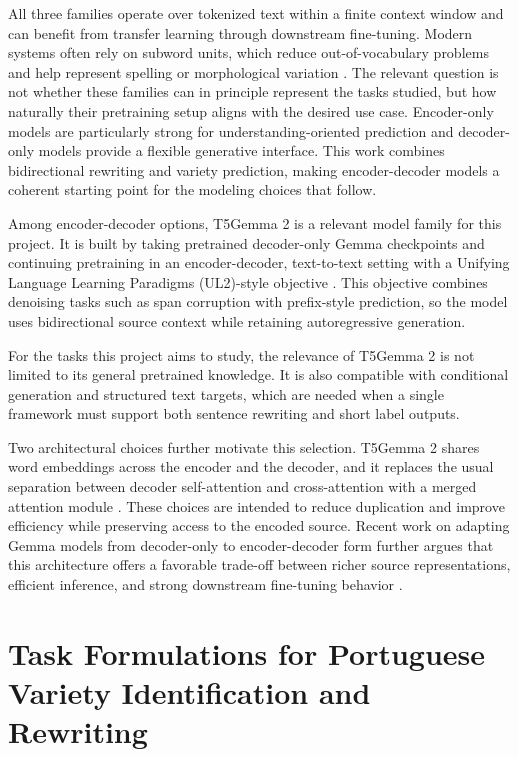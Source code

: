 All three families operate over tokenized text within a finite context window
and can benefit from transfer learning through downstream fine-tuning. Modern
systems often rely on subword units, which reduce out-of-vocabulary problems
and help represent spelling or morphological variation
\mbox{\citep{sennrich-etal-2016-neural}}.
The relevant question is not whether these families can in principle represent
the tasks studied, but how naturally their pretraining setup aligns
with the desired use case. Encoder-only models are particularly strong for
understanding-oriented prediction and decoder-only models provide a flexible
generative interface. This work combines bidirectional rewriting and variety prediction, making
encoder-decoder models a coherent starting point for the modeling choices that
follow.

Among encoder-decoder options, T5Gemma 2 is a relevant model family for this
project. It is built by taking pretrained decoder-only Gemma checkpoints and
continuing pretraining in an encoder-decoder, text-to-text
setting with a Unifying Language Learning Paradigms (UL2)-style objective
\citep{zhang2025t5gemma2seeingreading,Tay2023}. This objective combines denoising
tasks such as span corruption with prefix-style prediction, so the model uses
bidirectional source context while retaining autoregressive generation.

For the tasks this project aims to study, the relevance of T5Gemma 2 is not
limited to its general pretrained knowledge. It is also compatible with
conditional generation and structured text targets, which are needed when a
single framework must support both sentence rewriting and short label outputs.

Two architectural choices further motivate this selection. T5Gemma 2 shares
word embeddings across the encoder and the decoder, and it replaces the usual
separation between decoder self-attention and cross-attention with a merged
attention module \citep{zhang2025t5gemma2seeingreading}. These choices are
intended to reduce duplication and improve efficiency while preserving access to
the encoded source. Recent work on adapting Gemma models from decoder-only to
encoder-decoder form further argues that this architecture offers a favorable
trade-off between richer source representations, efficient inference, and
strong downstream fine-tuning behavior \citep{Zhang2025EncoderDecoderGI}.

\section{Task Formulations for Portuguese Variety Identification and Rewriting}
\label{sec:task-formulations}



